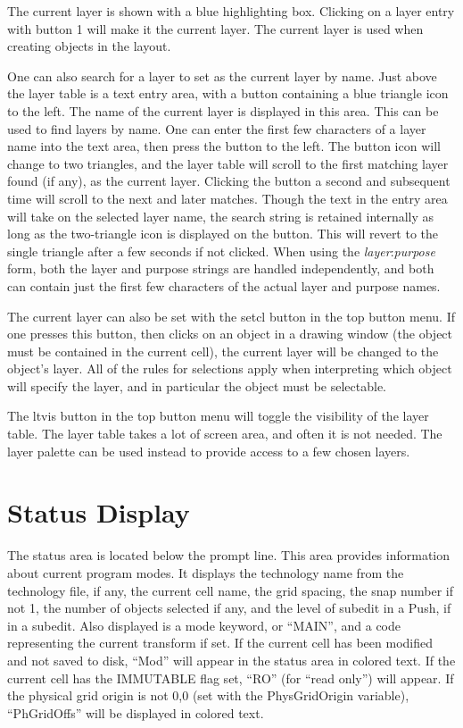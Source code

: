 The current layer is shown with a blue highlighting box.  Clicking
on a layer entry with button 1 will make it the current layer.
The current layer is used when creating objects in the layout.

One can also search for a layer to set as the current layer by name. 
Just above the layer table is a text entry area, with a button
containing a blue triangle icon to the left.  The name of the current
layer is displayed in this area.  This can be used to find layers by
name.  One can enter the first few characters of a layer name into the
text area, then press the button to the left.  The button icon will
change to two triangles, and the layer table will scroll to the first
matching layer found (if any), as the current layer.  Clicking the
button a second and subsequent time will scroll to the next and later
matches.  Though the text in the entry area will take on the selected
layer name, the search string is retained internally as long as the
two-triangle icon is displayed on the button.  This will revert to the
single triangle after a few seconds if not clicked.  When using the
{\it layer\/}{\vt :}{\it purpose} form, both the layer and purpose
strings are handled independently, and both can contain just the first
few characters of the actual layer and purpose names.

The current layer can also be set with the {\cb setcl} button in the
top button menu.  If one presses this button, then clicks on an object
in a drawing window (the object must be contained in the current
cell), the current layer will be changed to the object's layer.  All
of the rules for selections apply when interpreting which object will
specify the layer, and in particular the object must be selectable.

The {\cb ltvis} button in the top button menu will toggle the
visibility of the layer table.  The layer table takes a lot of screen
area, and often it is not needed.  The layer palette can be used
instead to provide access to a few chosen layers.


\section{Status Display}

The status area is located below the prompt line.  This area provides
information about current program modes.  It displays the technology
name from the technology file, if any, the current cell name, the grid
spacing, the snap number if not 1, the number of objects selected if
any, and the level of subedit in a {\cb Push}, if in a subedit.  Also
displayed is a mode keyword, or ``{\vt MAIN}'', and a code
representing the current transform if set.  If the current cell has
been modified and not saved to disk, ``{\vt Mod}'' will appear in the
status area in colored text.  If the current cell has the IMMUTABLE
flag set, ``{\vt RO}'' (for ``read only'') will appear.  If the
physical grid origin is not 0,0 (set with the {\et PhysGridOrigin}
variable), ``{\vt PhGridOffs}'' will be displayed in colored text.

